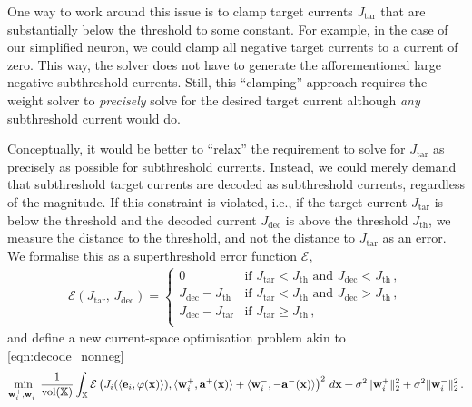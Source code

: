 One way to work around this issue is to clamp target currents $J_\mathrm{tar}$ that are substantially below the threshold to some constant.
For example, in the case of our simplified \LIF neuron, we could clamp all negative target currents to a current of zero.
This way, the solver does not have to generate the afforementioned large negative subthreshold currents.
Still, this \enquote{clamping} approach requires the weight solver to \emph{precisely} solve for the desired target current although \emph{any} subthreshold current would do.

Conceptually, it would be better to \enquote{relax} the requirement to solve for $J_\mathrm{tar}$ as precisely as possible for subthreshold currents.
Instead, we could merely demand that subthreshold target currents are decoded as subthreshold currents, regardless of the magnitude.
If this constraint is violated, i.e., if the target current $J_\mathrm{tar}$ is below the threshold and the decoded current $J_\mathrm{dec}$ is above the threshold $J_\mathrm{th}$, we measure the distance to the threshold, and not the distance to $J_\mathrm{tar}$ as an error.
We formalise this as a superthreshold error function $\mathcal{E}$,
\begin{align}
\mathcal{E}(J_\mathrm{tar}, \, J_\mathrm{dec}) = \begin{cases}
0 & \text{if } J_\mathrm{tar} < J_\mathrm{th} \text{ and } J_\mathrm{dec} < J_\mathrm{th} \,,\\
J_\mathrm{dec} - J_\mathrm{th} & \text{if } J_\mathrm{tar} < J_\mathrm{th} \text{ and } J_\mathrm{dec} > J_\mathrm{th} \,,\\
J_\mathrm{dec} - J_\mathrm{tar} & \text{if } J_\mathrm{tar} \geq J_\mathrm{th} \,,\\
\end{cases}
\label{eqn:subthreshold_error}
\end{align}
and define a new current-space optimisation problem akin to \cref{eqn:decode_nonneg}
\begin{align}
	\min_{\mathbf{w}_i^+, \mathbf{w}_i^-} 
	\frac{1}{\operatorname{vol}(\mathbb{X})}
	\int_{\mathbb{X}} \mathcal{E}\left( 
		J_i(\langle \mathbf{e}_i, \varphi(\mathbf{x})\rangle),
		\langle \mathbf{w}_i^+, \mathbf{a}^+(\mathbf{x}) \rangle +
		\langle \mathbf{w}_i^-, -\mathbf{a}^-(\mathbf{x}) \rangle
	\right)^2 \, d\mathbf{x}
	+ \sigma^2 \| \mathbf{w}^+_i \|_\mathrm{2}^2
	+ \sigma^2 \| \mathbf{w}^-_i \|_\mathrm{2}^2\,.
\label{eqn:decode_current_subthreshold}
\end{align}

